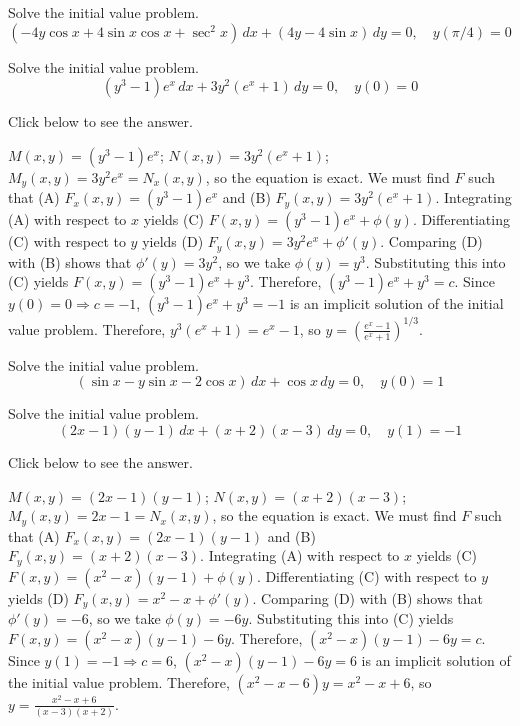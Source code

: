 \documentclass{ximera}
\begin{document}
\begin{problem}\label{exer:2.5.19} Solve the initial value problem.
$$(-4y\cos x+4\sin x\cos x+\sec^2x)\,dx+
(4y-4\sin x)\,dy=0,\quad y(\pi/4)=0$$
\end{problem}

\begin{problem}\label{exer:2.5.20} Solve the initial value problem.
$$(y^3-1)e^x\,dx+3y^2(e^x+1)\,dy=0,\quad y(0)=0$$

Click below to see the answer.

\begin{expandable}
    $M(x,y)=(y^3-1)e^x$;\;
$N(x,y)=3y^2(e^x+1)$;\;
$M_y(x,y)=3y^2e^x=N_x(x,y)$,
so the  equation is exact.
We must find $F$ such that
(A) $F_x(x,y)=(y^3-1)e^x$ and
(B) $F_y(x,y)=3y^2(e^x+1)$.
Integrating (A) with respect to $x$ yields
(C) $F(x,y)=(y^3-1)e^x+\phi(y)$.
Differentiating (C) with respect to $y$  yields
(D) $F_y(x,y)=3y^2e^x+\phi'(y)$.
Comparing (D) with (B)  shows that
$\phi'(y)=3y^2$, so we take
$\phi(y)=y^3$.
Substituting this into (C) yields
$F(x,y)=(y^3-1)e^x+y^3$.
Therefore, $(y^3-1)e^x+y^3=c$.
Since $y(0)=0\Rightarrow c=-1$,
$(y^3-1)e^x+y^3=-1$ is an implicit solution of  the initial value
problem. Therefore, $y^3(e^x+1)=e^x-1$, so
$y=\left(\frac{e^x-1}{e^x+1}\right)^{1/3}$.
\end{expandable}
\end{problem}

\begin{problem}\label{exer:2.5.21} Solve the initial value problem.
$$(\sin x-y\sin x-2\cos x)\,dx+\cos x\,dy=0,\quad y(0)=1$$
\end{problem}

\begin{problem}\label{exer:2.5.22} Solve the initial value problem.
$$(2x-1)(y-1)\,dx+(x+2)(x-3)\,dy=0,\quad y(1)=-1$$

Click below to see the answer.

\begin{expandable}
    $M(x,y)=(2x-1)(y-1)$;\;
$N(x,y)=(x+2)(x-3)$;\;
$M_y(x,y)=2x-1=N_x(x,y)$,
so the  equation is exact.
We must find $F$ such that
(A) $F_x(x,y)=(2x-1)(y-1)$ and
(B) $F_y(x,y)=(x+2)(x-3)$.
Integrating (A) with respect to $x$ yields
(C) $F(x,y)=(x^2-x)(y-1)+\phi(y)$.
Differentiating (C) with respect to $y$  yields
(D) $F_y(x,y)=x^2-x+\phi'(y)$.
Comparing (D) with (B)  shows that
$\phi'(y)=-6$, so we take
$\phi(y)=-6y$.
Substituting this into (C) yields
$F(x,y)=(x^2-x)(y-1)-6y$.
Therefore, $(x^2-x)(y-1)-6y=c$.
Since $y(1)=-1\Rightarrow c=6$,
$(x^2-x)(y-1)-6y=6$ is an implicit solution of  the initial value
problem. Therefore, $(x^2-x-6)y=x^2-x+6$, so
$y=\frac{x^2-x+6}{(x-3)(x+2)}$.
\end{expandable}
\end{problem}
\end{document}
